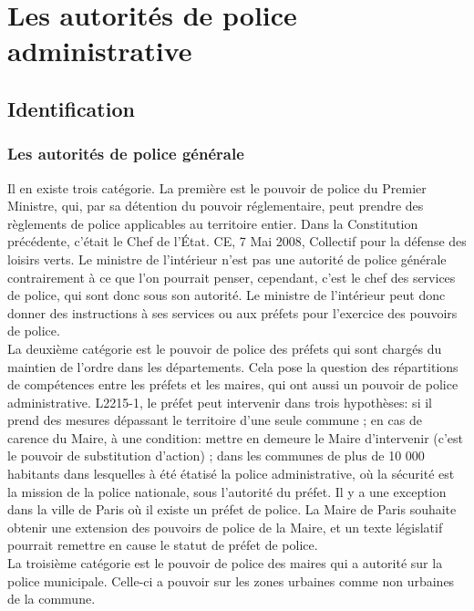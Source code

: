 \documentclass[10pt, a4paper, openany]{book}
\begin{document}
\section{Les autorités de police administrative}

\subsection{Identification}

\subsubsection{Les autorités de police générale}

Il en existe trois catégorie. La première est le pouvoir de police du Premier Ministre, qui, par sa détention du pouvoir réglementaire, peut prendre des règlements de police applicables au territoire entier. Dans la Constitution précédente, c'était le Chef de l'État. CE, 7 Mai 2008, Collectif pour la défense des loisirs verts. Le ministre de l'intérieur n'est pas une autorité de police générale contrairement à ce que l'on pourrait penser, cependant, c'est le chef des services de police, qui sont donc sous son autorité. Le ministre de l'intérieur peut donc donner des instructions à ses services ou aux préfets pour l'exercice des pouvoirs de police. \\
La deuxième catégorie est le pouvoir de police des préfets qui sont chargés du maintien de l'ordre dans les départements. Cela pose la question des répartitions de compétences entre les préfets et les maires, qui ont aussi un pouvoir de police administrative. L2215-1, le préfet peut intervenir dans trois hypothèses: si il prend des mesures dépassant le territoire d'une seule commune ; en cas de carence du Maire, à une condition: mettre en demeure le Maire d'intervenir (c'est le pouvoir de substitution d'action) ; dans les communes de plus de 10 000 habitants dans lesquelles à été étatisé la police administrative, où la sécurité est la mission de la police nationale, sous l'autorité du préfet. Il y a une exception dans la ville de Paris où il existe un préfet de police. La Maire de Paris souhaite obtenir une extension des pouvoirs de police de la Maire, et un texte législatif pourrait remettre en cause le statut de préfet de police. \\
La troisième catégorie est le pouvoir de police des maires qui a autorité sur la police municipale. Celle-ci a pouvoir sur les zones urbaines comme non urbaines de la commune. 
\end{document}
